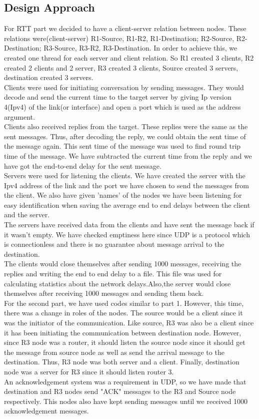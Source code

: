 \documentclass[conference]{IEEEtran}
\begin{document}
\subsection{Design Approach}
For RTT part we decided to have a client-server relation between nodes. These relations were(client-server) R1-Source, R1-R2, R1-Destination; R2-Source, R2-Destination; R3-Source, R3-R2, R3-Destination. In order to achieve this, we created one thread for each server and client relation. So R1 created 3 clients, R2 created 2 clients and 2 server, R3 created 3 clients, Source created 3 servers, destination created 3 servers. \\
Clients were used for initiating conversation by sending messages. They would decode and send the current time to the target server by giving Ip version 4(Ipv4) of the link(or interface) and open a port which is used as the address argument. \\
Clients also received replies from the target. These replies were the same as the sent messages. Thus, after decoding the reply, we could obtain the sent time of the message again. This sent time of the message was used to find round trip time of the message. We have subtracted the current time from the reply and we have got the end-to-end delay for the sent message.\\
Servers were used for listening the clients. We have created the server with the Ipv4 address of the link and the port we have chosen to send the messages from the client. We also have given 'names' of the nodes we have been listening for easy identification when saving the average end to end delays between the client and the server.\\
The servers have received data from the clients and have sent the message back if it wasn't empty. We have checked emptiness here since UDP is a protocol which is connectionless and there is no guarantee about message arrival to the destination.\\
The clients would close themselves after sending 1000 messages, receiving the replies and writing the end to end delay to a file. This file was used for calculating statistics about the network delays.Also,the server would close themselves after receiving 1000 messages and sending them back.\\
For the second part, we have used codes similar to part 1. However, this time, there was a change in roles of the nodes. The source would be a client since it was the initiator of the communication. Like source, R3 was also be a client since it has been initiating the communication between destination node. However, since R3 node was a router,  it should listen the source node since it should get the message from source node as well as send the arrival message to the destination. Thus, R3 node was both server and a client. Finally, destination node was a server for R3 since it should listen router 3. \\ 
An acknowledgement system was a requirement in UDP, so we have made that destination and R3 nodes send "ACK" messages to the R3 and Source node respectively. This nodes also have kept sending messages until we received 1000 acknowledgement messages.\\  
\end{document}
